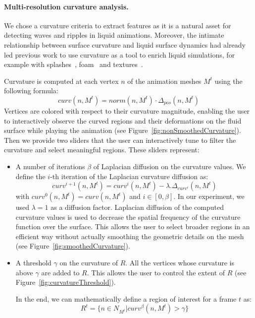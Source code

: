 \documentclass[review]{acmsiggraph}
\begin{document}
\paragraph*{Multi-resolution curvature analysis.}
We chose a curvature criteria to extract features as it is a natural asset for detecting waves and ripples in liquid animations. Moreover, the intimate relationship between surface curvature and liquid surface dynamics had already led previous work to use curvature as a tool to enrich liquid simulations, for example with splashes~\cite{Takahashi2003}, foam~\cite{Ihmsen2012} and textures~\cite{Narain2007}.

Curvature is computed at each vertex $n$ of the animation meshes $M^t$ using the following formula:
\begin{equation}
curv(n,M^t) = norm(n,M^t) \cdot \Delta_{pos}(n,M^t)
\end{equation}
Vertices are colored with respect to their curvature magnitude, enabling the user to interactively observe the curved regions and their deformations on the fluid surface while playing the animation (see Figure~\ref{fig:nonSmoothedCurvature}). 
Then we provide two sliders that the user can interactively tune to filter the curvature and select meaningful regions.
These sliders represent:
\begin{itemize}
\item A number of iterations $\beta$ of Laplacian diffusion on the curvature values.
We define the $i$-th iteration of the Laplacian curvature diffusion as:
\begin{equation}
    curv^{i+1}(n,M^t) = curv^i(n,M^t) - \lambda . \Delta_{curv^i}(n,M^t)
\end{equation}
with $curv^0(n,M^t) = curv(n,M^t)$ and $i \in \left[0,\beta\right]$.
In our experiment, we used $\lambda=1$ as a diffusion factor.
Laplacian diffusion of the computed curvature values is used to decrease the spatial frequency of the curvature function over the surface.
This allows the user to select broader regions in an efficient way without actually smoothing the geometric details on the mesh (see Figure~\ref{fig:smoothedCurvature}). 
\item A threshold $\gamma$ on the curvature of $R$. All the vertices whose curvature is above $\gamma$ are added to $R$. This allows the user to control the extent of $R$ (see Figure~\ref{fig:curvatureThreshold}). 

In the end, we can mathematically define a region of interest for a frame $t$ as:
\begin{equation}
 R^t = \{ n\in N_{M^t} \vert curv^{\beta}(n,M^t) > \gamma \}
\end{equation}
\end{itemize}
\end{document}
